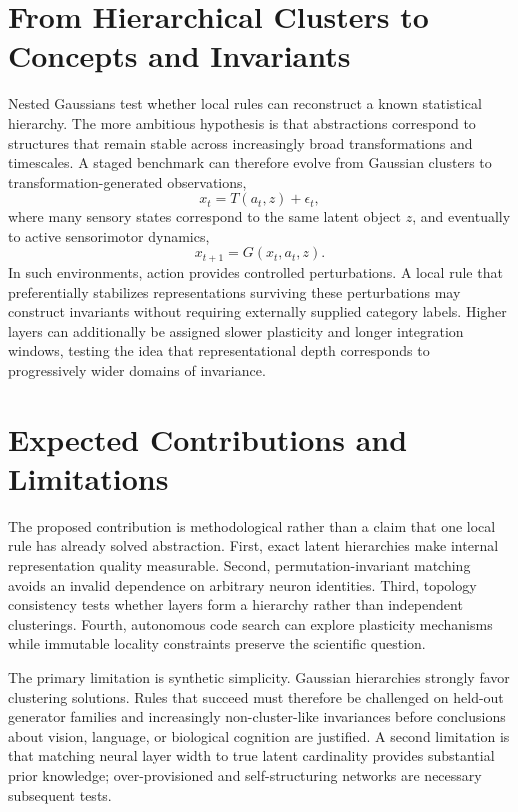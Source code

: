 \documentclass[11pt]{article}
\begin{document}
\section{From Hierarchical Clusters to Concepts and Invariants}
Nested Gaussians test whether local rules can reconstruct a known statistical hierarchy. The more ambitious hypothesis is that abstractions correspond to structures that remain stable across increasingly broad transformations and timescales. A staged benchmark can therefore evolve from Gaussian clusters to transformation-generated observations,
\begin{equation}
x_t=T(a_t,z)+\epsilon_t,
\end{equation}
where many sensory states correspond to the same latent object $z$, and eventually to active sensorimotor dynamics,
\begin{equation}
x_{t+1}=G(x_t,a_t,z).
\end{equation}
In such environments, action provides controlled perturbations. A local rule that preferentially stabilizes representations surviving these perturbations may construct invariants without requiring externally supplied category labels. Higher layers can additionally be assigned slower plasticity and longer integration windows, testing the idea that representational depth corresponds to progressively wider domains of invariance.

\section{Expected Contributions and Limitations}
The proposed contribution is methodological rather than a claim that one local rule has already solved abstraction. First, exact latent hierarchies make internal representation quality measurable. Second, permutation-invariant matching avoids an invalid dependence on arbitrary neuron identities. Third, topology consistency tests whether layers form a hierarchy rather than independent clusterings. Fourth, autonomous code search can explore plasticity mechanisms while immutable locality constraints preserve the scientific question.

The primary limitation is synthetic simplicity. Gaussian hierarchies strongly favor clustering solutions. Rules that succeed must therefore be challenged on held-out generator families and increasingly non-cluster-like invariances before conclusions about vision, language, or biological cognition are justified. A second limitation is that matching neural layer width to true latent cardinality provides substantial prior knowledge; over-provisioned and self-structuring networks are necessary subsequent tests.
\end{document}
